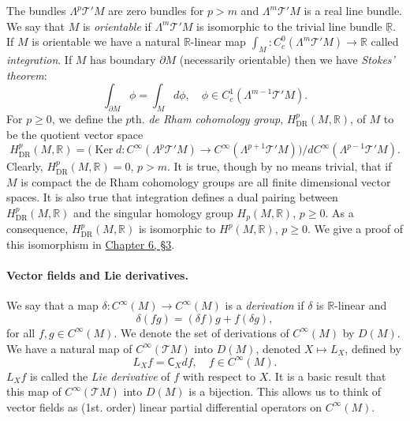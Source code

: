 The bundles $\Lambda^p\mathcal T'M$ are zero bundles for $p>m$ and $\Lambda^m\mathcal T'M$ is a real line bundle. We say that $M$ is \emph{orientable} if $\Lambda^m\mathcal T'M$ is isomorphic to the trivial line bundle $\underline{\mathbb R}$. If $M$ is orientable we have a natural $\mathbb R$-linear map $\int_M:C_c^0(\Lambda^m\mathcal T'M)\to\mathbb R$ called \emph{integration}. If $M$ has boundary $\partial M$ (necessarily orientable) then we have \emph{Stokes' theorem}:
\[
\int_{\partial M}\phi=\int_M d\phi,\quad\phi\in C_c^1(\Lambda^{m-1}\mathcal T'M).
\]
For $p\geq0$, we define the $p$th. \emph{de Rham cohomology group}, $H_{\mathrm{DR}}^p(M,\mathbb R)$, of $M$ to be the quotient vector space
\[
H_{\mathrm{DR}}^p(M,\mathbb R)=\bigl(\operatorname{Ker}d:C^\infty(\Lambda^p\mathcal T'M)\to C^\infty(\Lambda^{p+1}\mathcal T'M)\bigr)/dC^\infty(\Lambda^{p-1}\mathcal T'M).
\]
Clearly, $H_{\mathrm{DR}}^p(M,\mathbb R)=0$, $p>m$. It is true, though by no means trivial, that if $M$ is compact the de Rham cohomology groups are all finite dimensional vector spaces. It is also true that integration defines a dual pairing between $H_{\mathrm{DR}}^p(M,\mathbb R)$ and the singular homology group $H_p(M,\mathbb R)$, $p\geq0$. As a consequence, $H_{\mathrm{DR}}^p(M,\mathbb R)$ is isomorphic to $H^p(M,\mathbb R)$, $p\geq0$. We give a proof of this isomorphism in \hyperref[sec:6:3]{Chapter 6, \S3}.
\paragraph{Vector fields and Lie derivatives.} We say that a map $\delta:C^\infty(M)\to C^\infty(M)$ is a \emph{derivation} if $\delta$ is $\mathbb R$-linear and
\[
\delta(fg)=(\delta f)g+f(\delta g),
\]
for all $f,g\in C^\infty(M)$. We denote the set of derivations of $C^\infty(M)$ by $D(M)$. We have a natural map of $C^\infty(\mathcal T M)$ into $D(M)$, denoted $X\mapsto L_X$, defined by
\[
L_X f=\mathsf C_X df,\quad f\in C^\infty(M).
\]
$L_X f$ is called the \emph{Lie derivative} of $f$ with respect to $X$. It is a basic result that this map of $C^\infty(\mathcal T M)$ into $D(M)$ is a bijection. This allows us to think of vector fields as (1st. order) linear partial differential operators on $C^\infty(M)$.


